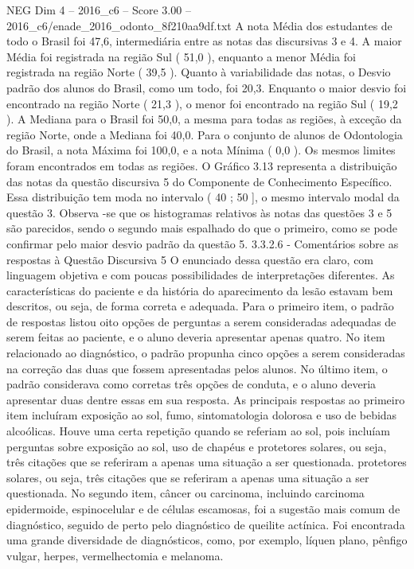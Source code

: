 \begin{textsample}{NEG Dim 4 – 2016\_c6 – Score 3.00 – 2016\_c6/enade\_2016\_odonto\_8f210aa9df.txt}
A nota Média dos estudantes de todo o Brasil foi 47,6, intermediária entre as notas das discursivas 3 e 4.
A maior Média foi registrada na região Sul ( 51,0 ), enquanto a menor Média foi registrada na região Norte ( 39,5 ).
Quanto à variabilidade das notas, o Desvio padrão dos alunos do Brasil, como um todo, foi 20,3.
Enquanto o maior desvio foi encontrado na região Norte ( 21,3 ), o menor foi encontrado na região Sul ( 19,2 ).
A Mediana para o Brasil foi 50,0, a mesma para todas as regiões, à exceção da região Norte, onde a Mediana foi 40,0.
Para o conjunto de alunos de Odontologia do Brasil, a nota Máxima foi 100,0, e a nota Mínima ( 0,0 ).
Os mesmos limites foram encontrados em todas as regiões.
O Gráfico 3.13 representa a distribuição das notas da questão discursiva 5 do Componente de Conhecimento Específico.
Essa distribuição tem moda no intervalo ( 40 ; 50 ], o mesmo intervalo modal da questão 3.
Observa -se que os histogramas relativos às notas das questões 3 e 5 são parecidos, sendo o segundo mais espalhado do que o primeiro, como se pode confirmar pelo maior desvio padrão da questão 5. 3.3.2.6 - Comentários sobre as respostas à Questão Discursiva 5 O enunciado dessa questão era claro, com linguagem objetiva e com poucas possibilidades de interpretações diferentes.
As características do paciente e da história do aparecimento da lesão estavam bem descritos, ou seja, de forma correta e adequada.
Para o primeiro item, o padrão de respostas listou oito opções de perguntas a serem consideradas adequadas de serem feitas ao paciente, e o aluno deveria apresentar apenas quatro.
No item relacionado ao diagnóstico, o padrão propunha cinco opções a serem consideradas na correção das duas que fossem apresentadas pelos alunos.
No último item, o padrão considerava como corretas três opções de conduta, e o aluno deveria apresentar duas dentre essas em sua resposta.
As principais respostas ao primeiro item incluíram exposição ao sol, fumo, sintomatologia dolorosa e uso de bebidas alcoólicas.
Houve uma certa repetição quando se referiam ao sol, pois incluíam perguntas sobre exposição ao sol, uso de chapéus e protetores solares, ou seja, três citações que se referiram a apenas uma situação a ser questionada. protetores solares, ou seja, três citações que se referiram a apenas uma situação a ser questionada.
No segundo item, câncer ou carcinoma, incluindo carcinoma epidermoide, espinocelular e de células escamosas, foi a sugestão mais comum de diagnóstico, seguido de perto pelo diagnóstico de queilite actínica.
Foi encontrada uma grande diversidade de diagnósticos, como, por exemplo, líquen plano, pênfigo vulgar, herpes, vermelhectomia e melanoma.

\end{textsample}

